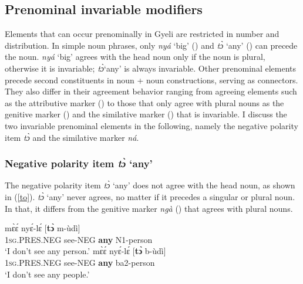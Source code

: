 \subsection{Prenominal invariable modifiers}
\label{sec:InvQUANT1}

Elements that can occur prenominally in Gyeli are restricted in number and distribution. In simple noun phrases, only {\itshape nyá} `big' () and {\itshape tɔ̀} `any' () can precede the noun. {\itshape nyá} `big' agrees with the head noun only if the noun is plural, otherwise it is invariable; {\itshape tɔ̀}`any' is always invariable. Other prenominal elements precede second constituents in noun + noun constructions, serving as connectors. They also differ in their agreement behavior ranging from agreeing elements such as the attributive marker () to those that only agree with plural nouns as the genitive marker () and the similative marker () that is invariable. I discuss the two invariable prenominal elements in the following, namely the negative polarity item {\itshape tɔ̀} and the similative marker {\itshape ná}.


\subsubsection{Negative polarity item {\itshape tɔ̀} `any'}
\label{sec:to}

The negative polarity item {\itshape tɔ̀} `any' does not agree with the head noun, as shown in (\ref{to}). {\itshape tɔ̀} `any' never agrees, no matter if it precedes a singular or plural noun. In that, it differs from the genitive marker {\itshape ngà} () that agrees with plural nouns.

\begin{exe}
\ex\label{to}
\begin{xlist}
\ex \label{to1}
  \gll    mɛ̀ɛ́ nyɛ́-lɛ́ [{\bfseries tɔ̀} m-ùdì] \\
              1\textsc{sg}.PRES.NEG see-NEG {\bfseries any} N1-person \\
    \trans `I don't see any person.'
\ex \label{to2}
  \gll    mɛ̀ɛ́ nyɛ́-lɛ́ [{\bfseries tɔ̀} b-ùdì] \\
              1\textsc{sg}.PRES.NEG see-NEG {\bfseries any} ba2-person \\
    \trans `I don't see any people.'
\end {xlist}
\end{exe}

